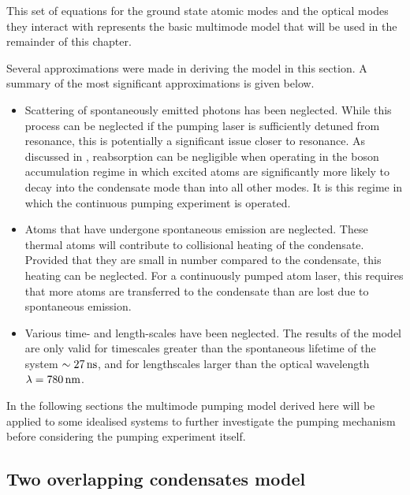 This set of equations for the ground state atomic modes and the optical modes they interact with represents the basic multimode model that will be used in the remainder of this chapter.

\parasep

Several approximations were made in deriving the model in this section.  A summary of the most significant approximations is given below.
\begin{itemize}
    \item Scattering of spontaneously emitted photons has been neglected.  While this process can be neglected if the pumping laser is sufficiently detuned from resonance, this is potentially a significant issue closer to resonance.  As discussed in , reabsorption can be negligible when operating in the boson accumulation regime in which excited atoms are significantly more likely to decay into the condensate mode than into all other modes.  It is this regime in which the continuous pumping experiment is operated.
    \item Atoms that have undergone spontaneous emission are neglected.  These thermal atoms will contribute to collisional heating of the condensate.  Provided that they are small in number compared to the condensate, this heating can be neglected.  For a continuously pumped atom laser, this requires that more atoms are transferred to the condensate than are lost due to spontaneous emission.
    \item Various time- and length-scales have been neglected.  The results of the model are only valid for timescales greater than the spontaneous lifetime of the system $\sim \unit[27]{ns}$, and for lengthscales larger than the optical wavelength $\lambda = \unit[780]{nm}$.
\end{itemize}

In the following sections the multimode pumping model derived here will be applied to some idealised systems to further investigate the pumping mechanism before considering the pumping experiment itself.

\subsection{Two overlapping condensates model}
\label{OpticalPumping:SimpleModels:OverlappingCondensatesModel}

